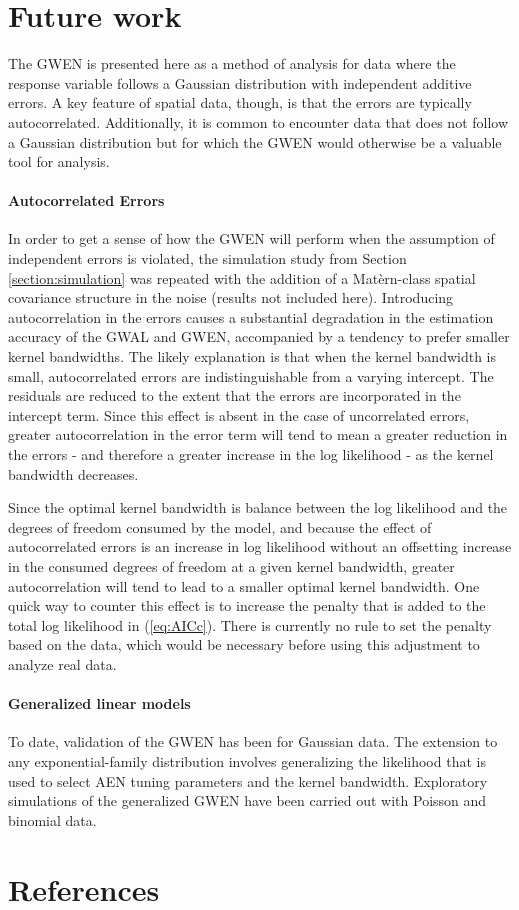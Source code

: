\documentclass[authoryear, review, 11pt]{elsarticle}
\begin{document}
\section{Future work \label{section:future-work}}
	The GWEN is presented here as a method of analysis for data where the response variable follows a Gaussian distribution with independent additive errors. A key feature of spatial data, though, is that the errors are typically autocorrelated. Additionally, it is common to encounter data that does not follow a Gaussian distribution but for which the GWEN would otherwise be a valuable tool for analysis.

	\paragraph{Autocorrelated Errors} In order to get a sense of how the GWEN will perform when the assumption of independent errors is violated, the simulation study from Section \ref{section:simulation} was repeated with the addition of a Mat\`{e}rn-class spatial covariance structure in the noise (results not included here). Introducing autocorrelation in the errors causes a substantial degradation in the estimation accuracy of the GWAL and GWEN, accompanied by a tendency to prefer smaller kernel bandwidths. The likely explanation is that when the kernel bandwidth is small, autocorrelated errors are indistinguishable from a varying intercept. The residuals are reduced to the extent that the errors are incorporated in the intercept term. Since this effect is absent in the case of uncorrelated errors, greater autocorrelation in the error term will tend to mean a greater reduction in the errors - and therefore a greater increase in the log likelihood - as the kernel bandwidth decreases.
	
	Since the optimal kernel bandwidth is balance between the log likelihood and the degrees of freedom consumed by the model, and because the effect of autocorrelated errors is an increase in log likelihood without an offsetting increase in the consumed degrees of freedom at a given kernel bandwidth, greater autocorrelation will tend to lead to a smaller optimal kernel bandwidth. One quick way to counter this effect is to increase the penalty that is added to the total log likelihood in (\ref{eq:AICc}). There is currently no rule to set the penalty based on the data, which would be necessary before using this adjustment to analyze real data.
	
	\paragraph{Generalized linear models} To date, validation of the GWEN has been for Gaussian data. The extension to any exponential-family distribution involves generalizing the likelihood that is used to select AEN tuning parameters and the kernel bandwidth. Exploratory simulations of the generalized GWEN have been carried out with Poisson and binomial data.

\section{References}


\end{document}
